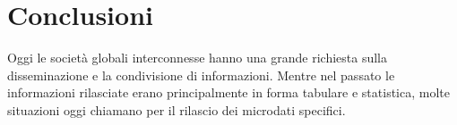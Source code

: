 \section{Conclusioni}
Oggi le società globali interconnesse hanno una grande richiesta sulla disseminazione e la condivisione di informazioni. Mentre nel passato le informazioni rilasciate erano principalmente in forma tabulare e statistica, molte situazioni oggi chiamano per il rilascio dei microdati specifici. 